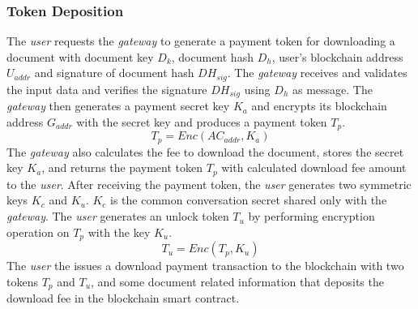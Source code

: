 \documentclass[conference]{IEEEtran}
\begin{document}
\subsubsection{Token Deposition}
The {\it user} requests the {\it gateway} to generate a payment token for downloading a document with document key $D_k$, document hash $D_h$, user's blockchain address $U_{addr}$ and signature of document hash $DH_{sig}$. The {\it gateway} receives and validates the input data and verifies the signature $DH_{sig}$ using $D_{h}$ as message. The {\it gateway} then generates a payment secret key $K_a$ and encrypts its blockchain address $G_{addr}$ with the secret key and produces a payment token $T_{p}$. 
\begin{equation}
\label{eq-d-1}
T_p = Enc (AC_{addr}, K_a)
\end{equation}
The {\it gateway} also calculates the fee to download the document, stores the secret key $K_a$, and returns the payment token $T_p$ with calculated download fee amount to the {\it user}.
After receiving the payment token, the {\it user} generates two symmetric keys $K_c$ and $K_u$. $K_c$ is the common conversation secret shared only with the {\it gateway}. The {\it user} generates an unlock token $T_u$ by performing encryption operation on $T_p$ with the key $K_u$.
\begin{equation}
\label{eq-d-2}
T_u = Enc (T_p, K_u)
\end{equation}
The {\it user} the issues a download payment transaction to the blockchain with two tokens $T_p$ and $T_u$, and some document related information that deposits the download fee in the blockchain smart contract.
\end{document}
